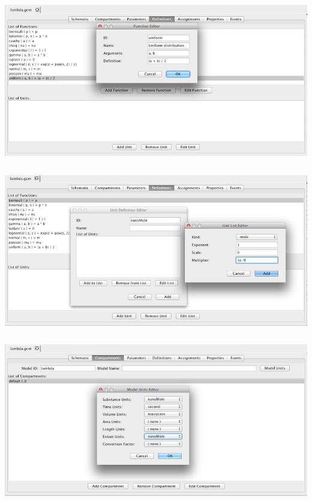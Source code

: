 \documentclass[titlepage,11pt]{article}
\begin{document}


\begin{center}
\includegraphics[height=70mm]{screenshots/function}
\end{center}

\begin{center}
\includegraphics[height=70mm]{screenshots/units}
\end{center}

\begin{center}
\includegraphics[height=70mm]{screenshots/ModelUnits}
\end{center}
\end{document}
